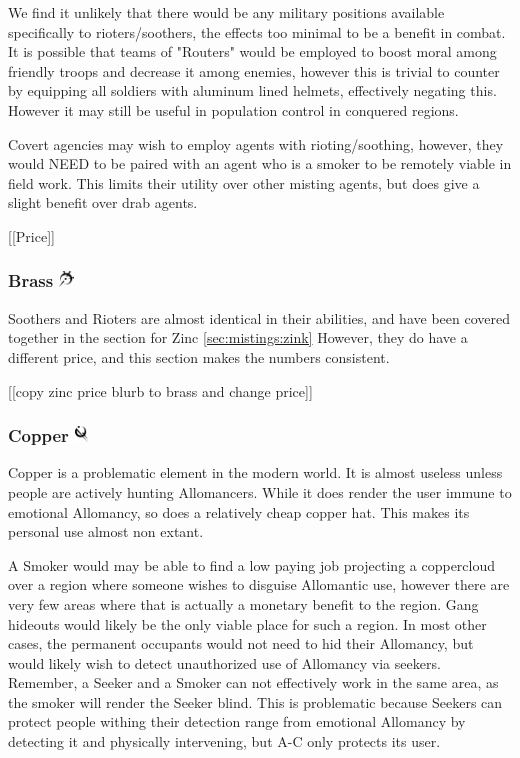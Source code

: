 \documentclass[conference]{IEEEtran}
\begin{document}
	We find it unlikely that there would be any military positions available specifically to rioters/soothers, the effects too minimal to be a benefit in combat.  It is possible that teams of "Routers" would be employed to boost moral among friendly troops and decrease it among enemies, however this is trivial to counter by equipping all soldiers with aluminum lined helmets, effectively negating this.  However it may still be useful in population control in conquered regions.
	
	Covert agencies may wish to employ agents with rioting/soothing, however, they would NEED to be paired with an agent who is a smoker to be remotely viable in field work.  This limits their utility over other misting agents, but does give a slight benefit over drab agents.
	
	[[Price]]
	\subsubsection{\textbf{Brass}    \includegraphics[height=1em]{images/Brass.png}}\label{sec:mistings:brass}
	Soothers and Rioters are almost identical in their abilities, and have been covered together in the section for Zinc \ref{sec:mistings:zink}
	However, they do have a different price, and this section makes the numbers consistent.
	
	[[copy zinc price blurb to brass and change price]]
	\subsubsection{\textbf{Copper}    \includegraphics[height=1em]{images/Copper.png}}\label{sec:mistings:copper}
	Copper is a problematic element in the modern world.  It is almost useless unless people are actively hunting Allomancers.  While it does render the user immune to emotional Allomancy, so does a relatively cheap copper hat.  This makes its personal use almost non extant.
	
	A Smoker would may be able to find a low paying job projecting a coppercloud over a region where someone wishes to disguise Allomantic use, however there are very few areas where that is actually a monetary benefit to the region.  Gang hideouts would likely be the only viable place for such a region.  In most other cases, the permanent occupants would not need to hid their Allomancy, but would likely wish to detect unauthorized use of Allomancy via seekers.  Remember, a Seeker and a Smoker can not effectively work in the same area, as the smoker will render the Seeker blind.  This is problematic because Seekers can protect people withing their detection range from emotional Allomancy by detecting it and physically intervening, but A-C only protects its user.
	
\end{document}
